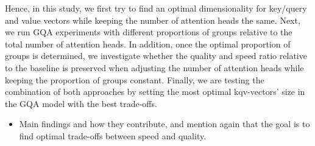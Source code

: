 Hence, in this study, we first try to find an optimal dimensionality for key/query and value vectors while keeping the number of attention heads the same. Next, we run GQA experiments with different proportions of groups relative to the total number of attention heads. In addition, once the optimal proportion of groups is determined, we investigate whether the quality and speed ratio relative to the baseline is preserved when adjusting the number of attention heads while keeping the proportion of groups constant. Finally, we are testing the combination of both approaches by setting the most optimal kqv-vectors' size in the GQA model with the best trade-offs. 

\begin{itemize}
    \item Main findings and how they contribute, and mention again that the goal is to find optimal trade-offs between speed and quality.
\end{itemize}






